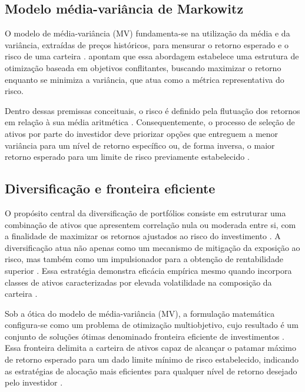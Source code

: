 \subsection{Modelo média-variância de Markowitz}
\label{subsec_modelo_media_variancia_de_markowitz}

O modelo de média-variância (MV) fundamenta-se na utilização da média e da variância, extraídas de preços históricos, para mensurar o retorno esperado e o risco de uma carteira \cite{chaweewanchon2022markowitz}.  apontam que essa abordagem estabelece uma estrutura de otimização baseada em objetivos conflitantes, buscando maximizar o retorno enquanto se minimiza a variância, que atua como a métrica representativa do risco.

Dentro dessas premissas conceituais, o risco é definido pela flutuação dos retornos em relação à sua média aritmética \cite{jeleskovic2024cryptocurrency}. Consequentemente, o processo de seleção de ativos por parte do investidor deve priorizar opções que entreguem a menor variância para um nível de retorno específico ou, de forma inversa, o maior retorno esperado para um limite de risco previamente estabelecido \cite{paiva2019decision}.

\subsection{Diversificação e fronteira eficiente}
\label{subsec_diversificacao_e_fronteira_eficiente}

O propósito central da diversificação de portfólios consiste em estruturar uma combinação de ativos que apresentem correlação nula ou moderada entre si, com a finalidade de maximizar os retornos ajustados ao risco do investimento \cite{bakry2021bitcoin}. A diversificação atua não apenas como um mecanismo de mitigação da exposição ao risco, mas também como um impulsionador para a obtenção de rentabilidade superior \cite{jeleskovic2024cryptocurrency}. Essa estratégia demonstra eficácia empírica mesmo quando incorpora classes de ativos caracterizadas por elevada volatilidade na composição da carteira \cite{bakry2021bitcoin}.

Sob a ótica do modelo de média-variância (MV), a formulação matemática configura-se como um problema de otimização multiobjetivo, cujo resultado é um conjunto de soluções ótimas denominado fronteira eficiente de investimentos \cite{paiva2019decision}. Essa fronteira delimita a carteira de ativos capaz de alcançar o patamar máximo de retorno esperado para um dado limite mínimo de risco estabelecido, indicando as estratégias de alocação mais eficientes para qualquer nível de retorno desejado pelo investidor \cite{paiva2019decision}.

